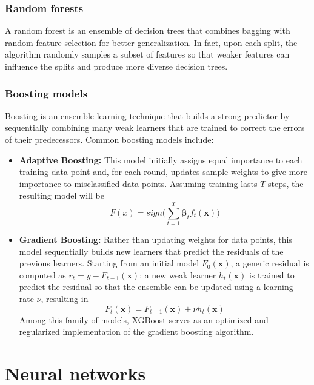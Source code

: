 \documentclass{report}
\begin{document}
\subsection{Random forests}
A random forest is an ensemble of decision trees that combines bagging with random feature selection for better generalization. \newline
In fact, upon each split, the algorithm randomly samples a subset of features so that weaker features can influence the splits and produce more diverse decision trees.
\subsection{Boosting models}
Boosting is an ensemble learning technique that builds a strong predictor by sequentially combining many weak learners that are trained to correct the errors of their predecessors. \newline
Common boosting models include:
\begin{itemize}
    \item \textbf{Adaptive Boosting: }This model initially assigns equal importance to each training data point and, for each round, updates sample weights to give more importance to misclassified data points. \newline
    Assuming training lasts $\displaystyle T$ steps, the resulting model will be
    \[F(x) = sign\Bigg(\sum_{t = 1}^T \mathbf{\beta}_tf_t(\mathbf{x})\Bigg)\]
    \item \textbf{Gradient Boosting: }Rather than updating weights for data points, this model sequentially builds new learners that predict the residuals of the previous learners. \newline
    Starting from an initial model $\displaystyle F_0(\mathbf{x})$, a generic residual is computed as $\displaystyle r_t = y - F_{t - 1}(\mathbf{x})$: a new weak learner $\displaystyle h_t(\mathbf{x})$ is trained to predict the residual so that the ensemble can be updated using a learning rate $\displaystyle \nu$, resulting in
    \[F_t(\mathbf{x}) = F_{t - 1}(\mathbf{x}) + \nu h_t(\mathbf{x})\]
    Among this family of models, XGBoost serves as an optimized and regularized implementation of the gradient boosting algorithm.
\end{itemize}

\chapter{Neural networks}
\end{document}
